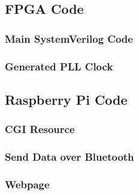 \documentclass[12pt]{article}
\begin{document}
\subsection{FPGA Code}
\label{sec:fpgacode}
\subsubsection{Main SystemVerilog Code}


\subsubsection{Generated PLL Clock}
{
\small

}
\subsection{Raspberry Pi Code}
\label{sec:pi}

\subsubsection{CGI Resource}


\subsubsection{Send Data over Bluetooth}


\subsubsection{Webpage}
\label{sec:webcode}

\end{document}
